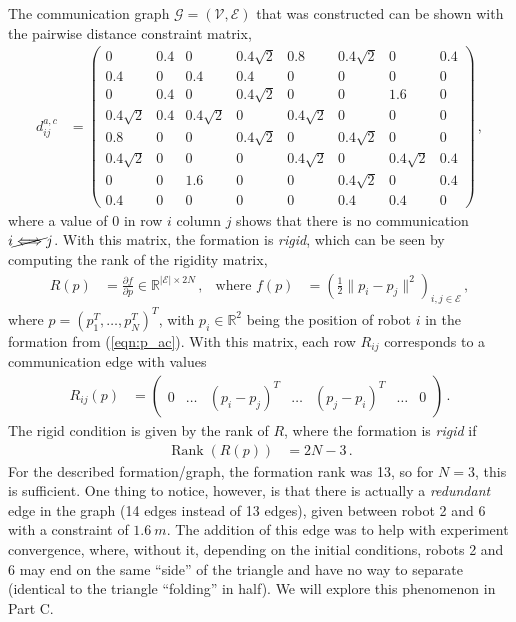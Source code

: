 \documentclass[11pt]{article}
\DeclareMathOperator{\rank}{Rank}
\begin{document}
The communication graph $\mathcal G=(\mathcal V,\mathcal E)$ that was constructed can be shown with the pairwise distance constraint matrix,
\begin{align}\label{eqn:graph_ac}
    d_{ij}^{a,c}&=\begin{pmatrix}
        0 & 0.4 & 0 & 0.4\sqrt 2 & 0.8 & 0.4\sqrt 2 & 0 & 0.4\\
        0.4 & 0 & 0.4 & 0.4 & 0 & 0 & 0 & 0\\
        0 & 0.4 & 0 & 0.4\sqrt 2 & 0 & 0 & 1.6 & 0\\
        0.4\sqrt 2 & 0.4 & 0.4\sqrt 2 & 0 & 0.4\sqrt 2 & 0 & 0 & 0\\
        0.8 & 0 & 0 & 0.4\sqrt 2 & 0 & 0.4\sqrt 2 & 0 & 0\\
        0.4\sqrt 2 & 0 & 0 & 0 & 0.4\sqrt 2 & 0 & 0.4\sqrt 2 & 0.4\\
        0 & 0 & 1.6 & 0 & 0 & 0.4\sqrt 2 & 0 & 0.4\\
        0.4 & 0 & 0 & 0 & 0 & 0.4 & 0.4 & 0
    \end{pmatrix}\,,
\end{align}
where a value of 0 in row $i$ column $j$ shows that there is no communication $i\cancel{\iff}j$. With this matrix, the formation is \textit{rigid}, which can be seen by computing the rank of the rigidity matrix,
\begin{align*}
    R(p)&=\frac{\partial f}{\partial p}\in\mathbb R^{|\mathcal E|\times2N}\,, & \text{where }f(p)&=\left(\frac12\|p_i-p_j\|^2\right)_{i,j\in\mathcal E}\,,
\end{align*}
where $p=(p_1^T,\dots,p_N^T)^T$, with $p_i\in\mathbb R^2$ being the position of robot $i$ in the formation from (\ref{eqn:p_ac}). With this matrix, each row $R_{ij}$ corresponds to a communication edge with values
\begin{align*}
    R_{ij}(p)&=\begin{pmatrix}
        0 & \dots & (p_i-p_j)^T & \dots & (p_j-p_i)^T & \dots & 0
    \end{pmatrix}\,.
\end{align*}
The rigid condition is given by the rank of $R$, where the formation is \textit{rigid} if
\begin{align*}
    \rank(R(p))&=2N-3\,.
\end{align*}
For the described formation/graph, the formation rank was 13, so for $N=3$, this is sufficient. One thing to notice, however, is that there is actually a \textit{redundant} edge in the graph (14 edges instead of 13 edges), given between robot 2 and 6 with a constraint of $1.6\ m$. The addition of this edge was to help with experiment convergence, where, without it, depending on the initial conditions, robots 2 and 6 may end on the same ``side'' of the triangle and have no way to separate (identical to the triangle ``folding'' in half). We will explore this phenomenon in Part C.
\end{document}
